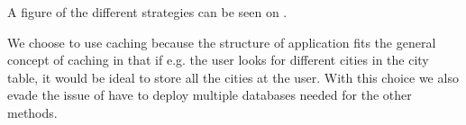 A figure of the different strategies can be seen on .


We choose to use caching because the structure of application fits the general concept of caching in that if e.g. the user looks for different cities in the city table, it would be ideal to store all the cities at the user. With this choice we also evade the issue of have to deploy multiple databases needed for the other methods.
